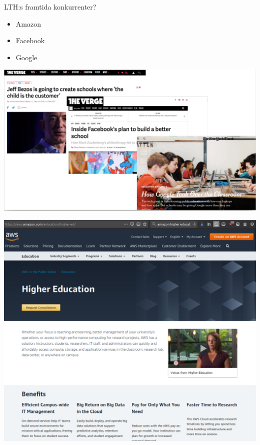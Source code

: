 \documentclass[aspectratio=169]{beamer}
\newenvironment{Slide}[1]%
  {\begin{frame}[environment=Slide]{#1}}
  {\end{frame}}%
\begin{document}
\begin{Slide}{LTH:s framtida konkurrenter?}
  \begin{minipage}{0.23\textwidth}
  \begin{itemize}
    \item Amazon
    \item Facebook
    \item Google
  \end{itemize}
  \end{minipage}
  \begin{minipage}{0.7\textwidth}
    \includegraphics[height=0.85\textheight]{../../img/afg}
  \end{minipage}
\end{Slide}

\begin{frame}[plain]
\includegraphics[height=1.3\textheight]{../../img/aws}
\end{frame}
\end{document}
